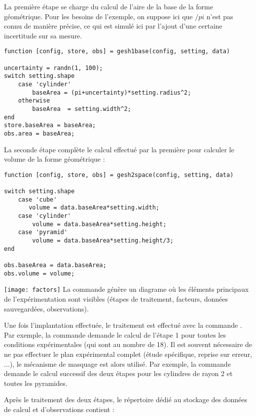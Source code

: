 La première étape se charge du calcul de l'aire de la base de la forme géométrique. Pour les besoins de l'exemple, on suppose ici que $/pi$ n'est pas connu de manière précise, ce qui est simulé ici par l'ajout d'une certaine incertitude sur sa mesure.

\begin{lstlisting}
function [config, store, obs] = gesh1base(config, setting, data)

uncertainty = randn(1, 100);
switch setting.shape
    case 'cylinder'
        baseArea = (pi+uncertainty)*setting.radius^2;
    otherwise
        baseArea  = setting.width^2;
end
store.baseArea = baseArea;
obs.area = baseArea;
\end{lstlisting}

La seconde étape complète le calcul effectué par la première pour calculer le volume de la forme géométrique :
\begin{lstlisting}
function [config, store, obs] = gesh2space(config, setting, data)

switch setting.shape
    case 'cube'
       volume = data.baseArea*setting.width;
    case 'cylinder'
        volume = data.baseArea*setting.height;
    case 'pyramid'
        volume = data.baseArea*setting.height/3;
end

obs.baseArea = data.baseArea;
obs.volume = volume;
\end{lstlisting}

\begin{marginfigure}
\texttt{[image: factors]}
La commande  génère un diagrame où les éléments principaux de l'expérimentation sont visibles (étapes de traitement, facteurs, données sauvegardées, observations).
\end{marginfigure}

Une fois l'implantation effectuée, le traitement est effectué avec la commande . Par exemple, la commande  demande le calcul de l'étape 1 pour toutes les conditions expérimentales (qui sont au nombre de 18). Il est souvent nécessaire de ne pas effectuer le plan expérimental complet (étude spécifique, reprise sur erreur, ...), le mécanisme de masquage est alors utilisé. Par exemple, la commande  demande le calcul successif des deux étapes pour les cylindres de rayon 2 et toutes les pyramides.

Après le traitement des deux étapes, le répertoire dédié au stockage des données de calcul et d'observations contient :
\begin{tabular}{cc}

\end{tabular}

